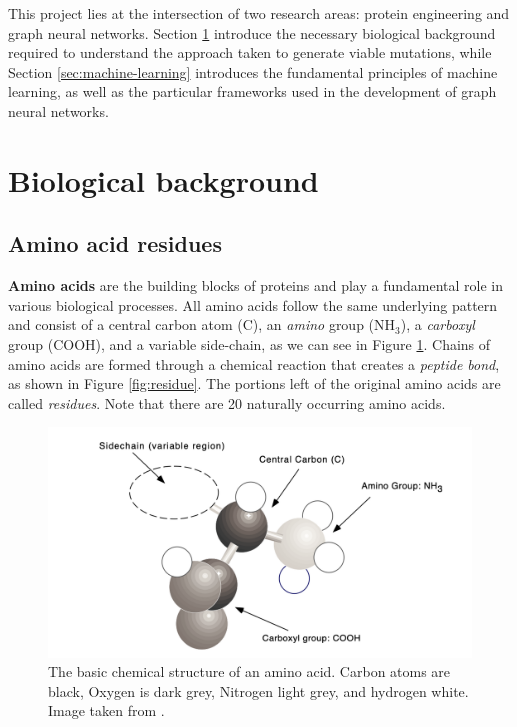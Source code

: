 This project lies at the intersection of two research areas: protein engineering and graph neural networks. Section \ref{sec:biological-background} introduce the necessary biological background required to understand the approach taken to generate viable mutations, while Section \ref{sec:machine-learning} introduces the fundamental principles of machine learning, as well as the particular frameworks used in the development of graph neural networks. 
\section{Biological background}
\label{sec:biological-background}
\subsection{Amino acid residues}
\label{amino-acids}
\textbf{Amino acids} are the building blocks of proteins and play a fundamental role in various biological processes.
All amino acids follow the same underlying pattern and consist of a central carbon atom (C), an \textit{amino} group ($\text{NH}_3$), a \textit{carboxyl} group (COOH), and a variable side-chain, as we can see in Figure \ref{fig:amino-acid}.
Chains of amino acids are formed through a chemical reaction that creates a \textit{peptide bond}, as shown in Figure \ref{fig:residue}. The portions left of the original amino acids are called \textit{residues}. Note that there are 20 naturally occurring amino acids.
\begin{figure}[!h]
    \centering
    \includegraphics[scale=0.5]{figures/amino-acid.png}
    \caption{The basic chemical structure of an amino acid. Carbon atoms are black, Oxygen is dark grey, Nitrogen light grey, and hydrogen white. Image taken from \cite{hunter1993molecular}.}
    \label{fig:amino-acid}
\end{figure}

